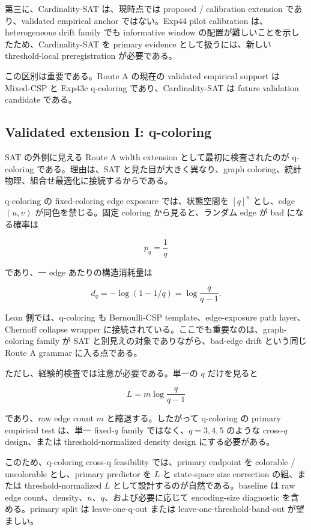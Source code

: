 \documentclass[12pt,a4paper]{article}
\begin{document}
第三に、Cardinality-SAT は、現時点では proposed / calibration extension であり、validated empirical anchor ではない。Exp44 pilot calibration は、heterogeneous drift family でも informative window の配置が難しいことを示したため、Cardinality-SAT を primary evidence として扱うには、新しい threshold-local preregistration が必要である。

この区別は重要である。Route A の現在の validated empirical support は Mixed-CSP と Exp43c q-coloring であり、Cardinality-SAT は future validation candidate である。

\subsection{Validated extension I: q-coloring}\label{validated-extension-i-q-coloring}

SAT の外側に見える Route A width extension として最初に検査されたのが q-coloring である。理由は、SAT と見た目が大きく異なり、graph coloring、統計物理、組合せ最適化に接続するからである。

q-coloring の fixed-coloring edge exposure では、状態空間を \([q]^n\) とし、edge \((u,v)\) が同色を禁じる。固定 coloring から見ると、ランダム edge が bad になる確率は

\[
p_{q}=\frac{1}{q}
\]

であり、一 edge あたりの構造消耗量は

\[
d_{q} = -\log(1-1/q) = \log\frac{q}{q-1}.
\]

Lean 側では、q-coloring も Bernoulli-CSP template、edge-exposure path layer、Chernoff collapse wrapper に接続されている。ここでも重要なのは、graph-coloring family が SAT と別見えの対象でありながら、bad-edge drift という同じ Route A grammar に入る点である。

ただし、経験的検査では注意が必要である。単一の \(q\) だけを見ると

\[
L=m\log\frac{q}{q-1}
\]

であり、raw edge count \(m\) と縮退する。したがって q-coloring の primary empirical test は、単一 fixed-\(q\) family ではなく、\(q=3,4,5\) のような cross-\(q\) design、または threshold-normalized density design にする必要がある。

このため、q-coloring cross-q feasibility では、primary endpoint を colorable / uncolorable とし、primary predictor を \(L\) と state-space size correction の組、または threshold-normalized \(L\) として設計するのが自然である。baseline は raw edge count、density、\(n\)、\(q\)、および必要に応じて encoding-size diagnostic を含める。primary split は leave-one-q-out または leave-one-threshold-band-out が望ましい。
\end{document}
